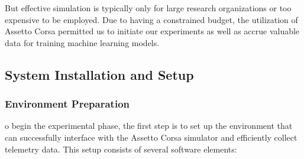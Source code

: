\documentclass[a4paper,final,12pt]{report}
\begin{document}
But effective simulation is typically only for large research organizations or too expensive to be employed. Due to having a constrained budget, the utilization of Assetto Corsa permitted us to initiate our experiments as well as accrue valuable data for training machine learning models.

\newpage

\subsection{System Installation and Setup}

\subsubsection{Environment Preparation}
o begin the experimental phase, the first step is to set up the environment that can successfully interface with the Assetto Corsa simulator and efficiently collect telemetry data. This setup consists of several software elements:
\end{document}
